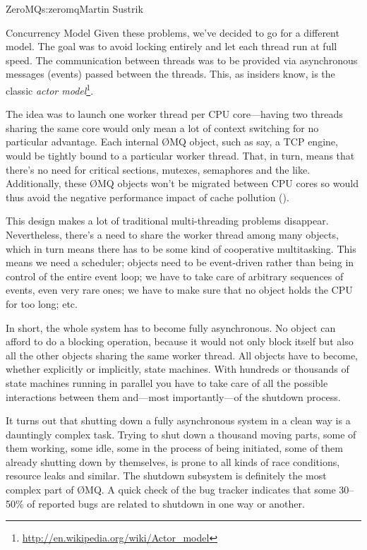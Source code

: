 \begin{aosachapter}{ZeroMQ}{s:zeromq}{Martin Sustrik}
\begin{aosasect1}{Concurrency Model}
Given these problems, we've decided to go for a different model. The
goal was to avoid locking entirely and let each thread run at full
speed. The communication between threads was to be provided via
asynchronous messages (events) passed between the threads. This, as
insiders know, is the classic \emph{actor
model}\footnote{\url{http://en.wikipedia.org/wiki/Actor_model}}.

The idea was to launch one worker thread per CPU core---having two
threads sharing the same core would only mean a lot of context
switching for no particular advantage. Each internal {\O}MQ object, such
as say, a TCP engine, would be tightly bound to a particular worker
thread. That, in turn, means that there's no need for critical
sections, mutexes, semaphores and the like. Additionally, these {\O}MQ
objects won't be migrated between CPU cores so would thus avoid the
negative performance impact of cache pollution
().


This design makes a lot of traditional multi-threading problems
disappear. Nevertheless, there's a need to share the worker thread
among many objects, which in turn means there has to be some kind of
cooperative multitasking. This means we need a scheduler; objects need 
to be event-driven
rather than being in control of the entire event loop; we have to take
care of arbitrary sequences of events, even very rare ones; we have to
make sure that no object holds the CPU for too long; etc.

In short, the whole system has to become fully asynchronous. No object can
afford to do a blocking operation, because it would not only block
itself but also all the other objects sharing the same worker thread. All
objects have to become, whether explicitly or implicitly, state
machines. With hundreds or thousands of state machines running in
parallel you have to take care of all the possible interactions
between them and---most importantly---of the shutdown process.

It turns out that shutting down a fully asynchronous system in a clean
way is a dauntingly complex task. Trying to shut down a thousand moving
parts, some of them working, some idle, some in the process of being
initiated, some of them already shutting down by themselves, is prone
to all kinds of race conditions, resource leaks and similar. The
shutdown subsystem is definitely the most complex part of {\O}MQ. A quick
check of the bug tracker indicates that some 30--50\% of reported bugs
are related to shutdown in one way or another.


\end{aosasect1}
\end{aosachapter}
